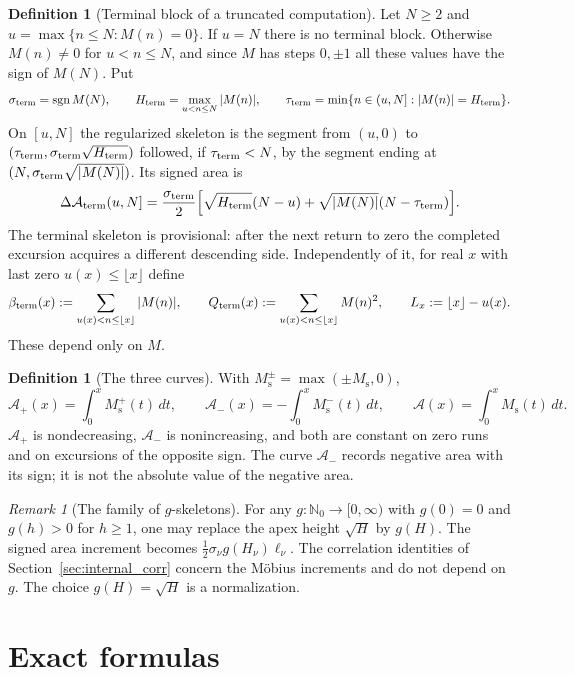 \documentclass[11pt]{amsart}
\numberwithin{equation}{section}
\theoremstyle{plain}
\theoremstyle{definition}
\newtheorem{definition}[theorem]{Definition}
\theoremstyle{remark}
\newtheorem{remark}[theorem]{Remark}
\DeclareMathOperator{\sgn}{sgn}
\newcommand{\Ms}{M_{\mathrm{s}}}
\newcommand{\Ap}{\mathcal{A}_{+}}
\newcommand{\Am}{\mathcal{A}_{-}}
\newcommand{\Anet}{\mathcal{A}}
\begin{document}
\begin{definition}[Terminal block of a truncated computation]
\label{def:Ms-terminal}
Let $N\ge2$ and $u=\max\{n\le N:M(n)=0\}$. If $u=N$ there is no terminal
block. Otherwise $M(n)\ne0$ for $u<n\le N$, and since $M$ has steps
$0,\pm1$ all these values have the sign of $M(N)$. Put
\[
\sigma_{\rm term}=\sgn M(N),\qquad
H_{\rm term}=\max_{u<n\le N}|M(n)|,\qquad
\tau_{\rm term}=\min\{n\in(u,N]:|M(n)|=H_{\rm term}\}.
\]
On $[u,N]$ the regularized skeleton is the segment from $(u,0)$ to
$(\tau_{\rm term},\sigma_{\rm term}\sqrt{H_{\rm term}})$ followed, if
$\tau_{\rm term}<N$, by the segment ending at
$(N,\sigma_{\rm term}\sqrt{|M(N)|})$. Its signed area is
\[
\Delta\Anet_{\rm term}(u,N]=\frac{\sigma_{\rm term}}2
\Bigl[\sqrt{H_{\rm term}}(N-u)+
\sqrt{|M(N)|}(N-\tau_{\rm term})\Bigr].
\]
The terminal skeleton is provisional: after the next return to zero the
completed excursion acquires a different descending side. Independently of
it, for real $x$ with last zero $u(x)\le\lfloor x\rfloor$ define
\[
\beta_{\rm term}(x):=\sum_{u(x)<n\le\lfloor x\rfloor}|M(n)|,\qquad
Q_{\rm term}(x):=\sum_{u(x)<n\le\lfloor x\rfloor}M(n)^2,\qquad
L_x:=\lfloor x\rfloor-u(x).
\]
These depend only on $M$.
\end{definition}

\begin{definition}[The three curves]
\label{def:areas}
With $\Ms^{\pm}=\max(\pm\Ms,0)$,
\begin{equation}
\label{eq:areas_def}
\Ap(x)=\int_0^x\Ms^+(t)\,dt,\qquad
\Am(x)=-\int_0^x\Ms^-(t)\,dt,\qquad
\Anet(x)=\int_0^x\Ms(t)\,dt.
\end{equation}
$\Ap$ is nondecreasing, $\Am$ is nonincreasing, and both are constant on
zero runs and on excursions of the opposite sign.  The curve $\Am$ records
negative area with its sign; it is not the absolute value of the negative
area.
\end{definition}

\begin{remark}[The family of $g$-skeletons]
\label{rem:g-skeleton}
For any $g:\mathbb N_0\to[0,\infty)$ with $g(0)=0$ and $g(h)>0$ for $h\ge1$,
one may replace the apex height $\sqrt H$ by $g(H)$. The signed area
increment becomes $\tfrac12\sigma_\nu g(H_\nu)\ell_\nu$. The correlation
identities of Section~\ref{sec:internal_corr} concern the M\"obius
increments and do not depend on $g$. The choice $g(H)=\sqrt H$ is a
normalization.
\end{remark}

\section{Exact formulas}
\label{sec:formulas}
\end{document}
